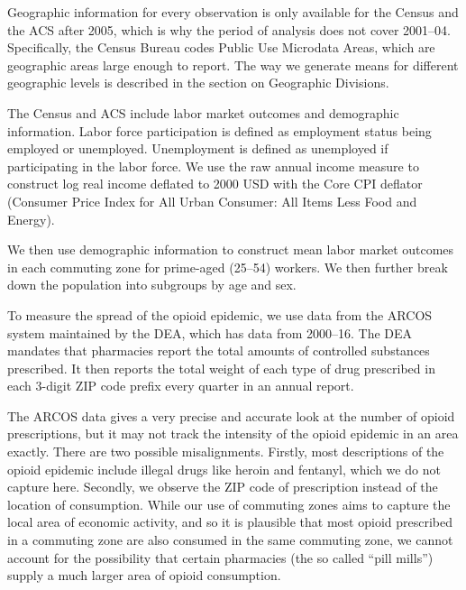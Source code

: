 \documentclass[12pt]{article}
\begin{document}
Geographic information for every observation is only available for the Census and the ACS after 2005, which is why the period of analysis does not cover 2001--04.  Specifically, the Census Bureau codes Public Use Microdata Areas, which are geographic areas large enough to report.  The way we generate means for different geographic levels is described in the section on Geographic Divisions.

The Census and ACS include labor market outcomes and demographic information.  Labor force participation is defined as employment status being employed or unemployed.  Unemployment is defined as unemployed if participating in the labor force.  We use the raw annual income measure to construct log real income deflated to 2000 USD with the Core CPI deflator (Consumer Price Index for All Urban Consumer: All Items Less Food and Energy).~

We then use demographic information to construct mean labor market outcomes in each commuting zone for prime-aged (25--54) workers.  We then further break down the population into subgroups by age and sex.

To measure the spread of the opioid epidemic, we use data from the ARCOS~ system maintained by the DEA, which has data from 2000--16.  The DEA mandates that pharmacies report the total amounts of controlled substances prescribed.  It then reports the total weight of each type of drug prescribed in each 3-digit ZIP code prefix every quarter in an annual report.

The ARCOS data gives a very precise and accurate look at the number of opioid prescriptions, but it may not track the intensity of the opioid epidemic in an area exactly.  There are two possible misalignments.  Firstly, most descriptions of the opioid epidemic include illegal drugs like heroin and fentanyl, which we do not capture here.  Secondly, we observe the ZIP code of prescription instead of the location of consumption.  While our use of commuting zones aims to capture the local area of economic activity, and so it is plausible that most opioid prescribed in a commuting zone are also consumed in the same commuting zone, we cannot account for the possibility that certain pharmacies (the so called ``pill mills'') supply a much larger area of opioid consumption.
\end{document}
